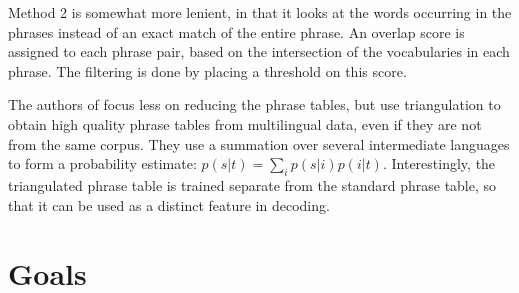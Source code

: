 \documentclass[11pt]{article}
\begin{document}
Method 2 is somewhat more lenient, in that it looks at the words occurring in the phrases instead of an exact match of the entire phrase. An overlap score is assigned to each phrase pair, based on the intersection of the vocabularies in each phrase. The filtering is done by placing a threshold on this score.

The authors of \cite{cohn} focus less on reducing the phrase tables, but use triangulation to obtain high quality phrase tables from multilingual data, even if they are not from the same corpus. They use a summation over several intermediate languages to form a probability estimate: $p(s|t)=\sum_i p(s|i)p(i|t)$. Interestingly, the triangulated phrase table is trained separate from the standard phrase table, so that it can be used as a distinct feature in decoding.

\section{Goals}
\end{document}
